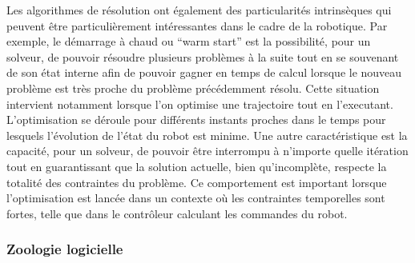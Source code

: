 %
Les algorithmes de résolution ont également des particularités
intrinsèques qui peuvent être particulièrement intéressantes dans le
cadre de la robotique. Par exemple, le démarrage à chaud ou ``warm
start''   est la possibilité, pour un solveur, de pouvoir résoudre
plusieurs problèmes à la suite tout en se souvenant de son état
interne afin de pouvoir gagner en temps de calcul lorsque le nouveau
problème est très proche du problème précédemment résolu. Cette
situation intervient notamment lorsque l'on optimise une trajectoire
tout en l'executant. L'optimisation se déroule pour différents
instants proches dans le temps pour lesquels l'évolution de l'état du
robot est minime. Une autre caractéristique est la capacité, pour un
solveur, de pouvoir être interrompu à n'importe quelle itération tout
en guarantissant que la solution actuelle, bien qu'incomplète,
respecte la totalité des contraintes du problème. Ce comportement est
important lorsque l'optimisation est lancée dans un contexte où les
contraintes temporelles sont fortes, telle que dans le contrôleur
calculant les commandes du robot.



\subsubsection{Zoologie logicielle}


